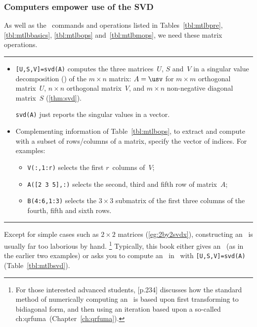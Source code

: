 \subsubsection{Computers empower use of the SVD}

\begin{table}
\caption{As well as the \script\ commands and operations listed in Tables~\ref{tbl:mtlbpre}, \ref{tbl:mtlbbasics}, \ref{tbl:mtlbops} and~\ref{tbl:mtlbmops},  we need these matrix operations.} \label{tbl:mtlbsvd}
\hrule
\begin{minipage}{\linewidth}
\begin{itemize}
\item {}\verb|[U,S,V]=svd(A)| computes the three matrices~\(U\), \(S\) and~\(V\) in a singular value decomposition (\svd) of the \(m\times n\) matrix: \(A=\usv\) for \(m\times m\) orthogonal matrix~\(U\), \(n\times n\) orthogonal matrix~\(V\), and \(m\times n\) non-negative diagonal matrix~\(S\) (\autoref{thm:svd}).

\verb|svd(A)| just reports the singular values in a vector.

\item Complementing information of Table~\ref{tbl:mtlbops}, to extract and compute with a subset of rows\slash columns of a matrix, specify the vector of indices.
For examples:
\begin{itemize}
\item \verb|V(:,1:r)| selects the first \(r\)~columns of~\(V\);
\item \verb|A([2 3 5],:)| selects the second, third and fifth row of matrix~\(A\);
\item \verb|B(4:6,1:3)| selects the \(3\times 3\) submatrix of the first three columns of the fourth, fifth and sixth rows.
\end{itemize}

\end{itemize}
\end{minipage}
\hrule
\end{table}




Except for simple cases such as \(2\times 2\) matrices (\autoref{eg:2by2svdx}), constructing an \svd\ is usually far too laborious by hand.  
\footnote{For those interested advanced students, \cite{Trefethen1997} [p.234] discusses how the standard method of numerically computing an \svd\ is based upon first transforming to bidiagonal form, and then using an iteration based upon a so-called  \ifcsname ch:qrfuma\endcsname\ (Chapter~\ref{ch:qrfuma})\fi.}
Typically, this book either gives an \svd\ (as in the earlier two examples) or asks you to compute an \svd\ in \script\ with \verb|[U,S,V]=svd(A)| (Table~\ref{tbl:mtlbsvd}).


